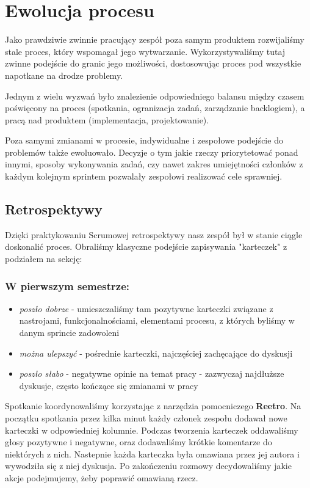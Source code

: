 \documentclass{article}
\begin{document}
\section{Ewolucja procesu}
Jako prawdziwie zwinnie pracujący zespół poza samym produktem rozwijaliśmy stale proces, który wspomagał jego wytwarzanie. Wykorzystywaliśmy tutaj zwinne podejście do granic jego możliwości, dostosowując proces pod wszystkie napotkane na drodze problemy.

Jednym z wielu wyzwań było znalezienie odpowiedniego balansu między czasem poświęcony na proces (spotkania, ogranizacja zadań, zarządzanie backlogiem), a pracą nad produktem (implementacja, projektowanie).

Poza samymi zmianami w procesie, indywidualne i zespołowe podejście do problemów także ewoluowało. Decyzje o tym jakie rzeczy priorytetować ponad innymi, sposoby wykonywania zadań, czy nawet zakres umiejętności członków z każdym kolejnym sprintem pozwalały zespołowi realizować cele sprawniej.

\subsection{Retrospektywy}
Dzięki praktykowaniu Scrumowej retrospektywy nasz zespół był w stanie ciągle doskonalić proces. Obraliśmy klasyczne podejście zapisywania "karteczek" z podziałem na sekcję:

\subsubsection*{W pierwszym semestrze:}
\begin{itemize}
    \item \textit{poszło dobrze} - umieszczaliśmy tam pozytywne karteczki związane z nastrojami, funkcjonalnościami, elementami procesu, z których byliśmy w danym sprincie zadowoleni
    \item \textit{można ulepszyć} - pośrednie karteczki, najczęściej zachęcające do dyskusji
    \item \textit{poszło słabo} - negatywne opinie na temat pracy - zazwyczaj najdłuższe dyskusje, często kończące się zmianami w pracy
\end{itemize}
Spotkanie koordynowaliśmy korzystając z narzędzia pomocniczego \textbf{Reetro}. Na początku spotkania przez kilka minut każdy członek zespołu dodawał nowe karteczki w odpowiedniej kolumnie. Podczas tworzenia karteczek oddawaliśmy głosy pozytywne i negatywne, oraz dodawaliśmy krótkie komentarze do niektórych z nich. Nastepnie każda karteczka była omawiana przez jej autora i wywodziła się z niej dyskusja. Po zakończeniu rozmowy decydowaliśmy jakie akcje podejmujemy, żeby poprawić omawianą rzecz.
\end{document}

